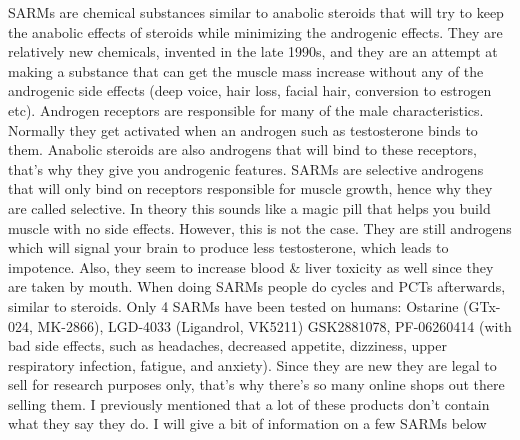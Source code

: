 \documentclass[openany, 12pt]{book}
\begin{document}
        SARMs are chemical substances similar to anabolic steroids that will try to keep the anabolic effects of steroids while minimizing the androgenic effects.
        They are relatively new chemicals, invented in the late 1990s, and they are an attempt at making a substance that can get the muscle mass increase without
        any of the androgenic side effects (deep voice, hair loss, facial hair, conversion to estrogen etc).
        Androgen receptors are responsible for many of the male characteristics. Normally they get activated when an androgen such as testosterone
        binds to them. Anabolic steroids are also androgens that will bind to these receptors, that's why they give you androgenic features.
        SARMs are selective androgens that will only bind on receptors responsible for muscle growth, hence why they are called selective. In theory this sounds like a magic pill
        that helps you build muscle with no side effects. However, this is not the case. They are still androgens which will signal your brain to produce less testosterone, which
        leads to impotence. Also, they seem to increase blood \& liver toxicity as well since they are taken by mouth. When doing SARMs people do cycles and PCTs afterwards, similar to steroids.
        Only 4 SARMs have been tested on humans: Ostarine (GTx-024, MK-2866), LGD-4033 (Ligandrol, VK5211)
        GSK2881078, PF-06260414 (with bad side effects, such as headaches, decreased appetite, dizziness, upper respiratory infection, fatigue, and anxiety).
        Since they are new they are legal to sell for research purposes only, that's why there's so many online shops out there selling them. I previously mentioned that a lot of these
        products don't contain what they say they do. I will give a bit of information on a few SARMs below
\end{document}
